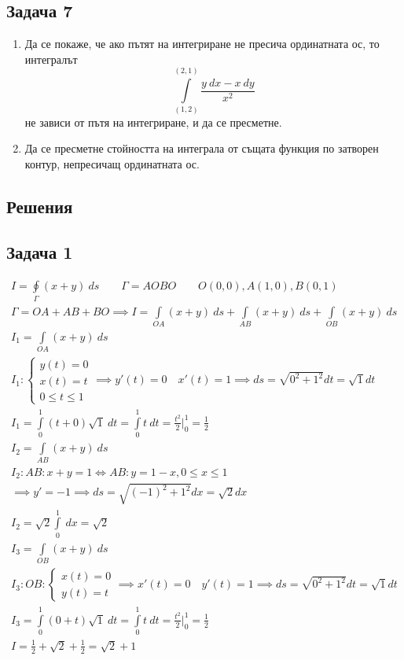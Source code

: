 \documentclass[a4paper,fleqn,12pt]{article}
\theoremstyle{definition}
\begin{document}
\subsection*{Задача 7}
\begin{enumerate}
\item Да се покаже, че ако пътят на интегриране не пресича ординатната ос, то интегралът
$$\int\limits_{(1,2)} ^{(2,1)} \frac{y \ dx - x \ dy}{x^2}$$
не зависи от пътя на интегриране, и да се пресметне. 
\item Да се пресметне стойността на интеграла от същата функция по затворен контур, непресичащ ординатната ос.
\end{enumerate}

\newpage
\subsection{Решения}

\subsection*{Задача 1}
\begin{gather*}
I = \oint\limits_{\Gamma} (x+y) \ ds \qquad \Gamma = AOBO \qquad O(0,0), A(1,0), B(0,1) \\
\Gamma = OA+AB+BO \implies I = \int\limits_{OA} (x+y) \ ds +  \int\limits_{AB} (x+y) \ ds +  \int\limits_{OB} (x+y) \ ds \\
I_1 = \int\limits_{OA} (x+y) \ ds  \\
I_1: \begin{cases} y(t) = 0 \\ x(t) = t \\ 0 \leq t \leq 1 \end{cases} \implies y'(t) = 0 \quad x'(t) = 1 \implies ds = \sqrt{0^2 + 1^2} dt = \sqrt{1} dt \\
I_1 = \int\limits_0 ^1 (t+0)\sqrt{1} \ dt = \int\limits_0 ^1 t \ dt = \frac{t^2}{2} \Big|_0 ^1 = \frac{1}{2} \\
I_2 = \int\limits_{AB} (x+y) \ ds  \\
I_2: AB: x+y=1 \Leftrightarrow AB: y=1-x, 0 \leq x \leq 1 \\
\implies y'=-1 \implies ds = \sqrt{(-1)^2 + 1^2} dx = \sqrt{2} dx \\
I_2 = \sqrt{2} \int\limits_0 ^1 \ dx = \sqrt{2} \\
I_3 = \int\limits_{OB} (x+y) \ ds  \\
I_3: OB: \begin{cases} x(t) = 0 \\ y(t) = t \end{cases} \implies x'(t) = 0 \quad y'(t) = 1 \implies ds = \sqrt{0^2 + 1^2} dt = \sqrt{1} dt \\
I_3 = \int\limits_0 ^1 (0+t)\sqrt{1} \ dt = \int\limits_0 ^1 t \ dt = \frac{t^2}{2} \Big|_0 ^1 = \frac{1}{2} \\
I = \frac{1}{2} + \sqrt{2} + \frac{1}{2} = \sqrt{2} + 1 
\end{gather*}
\end{document}
